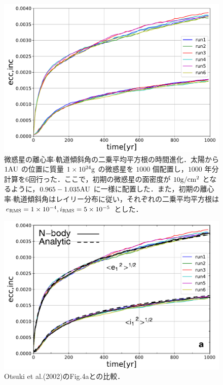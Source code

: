 \documentclass[11pt,a4paper,oneside,onecolumn]{jreport}
\begin{document}
\begin{figure}[H]
 \centering
 \includegraphics[width=12cm]{./image/Nbodytest_figa_6run.pdf}
 \caption{微惑星の離心率$\cdot$軌道傾斜角の二乗平均平方根の時間進化．太陽から $1 {\rm AU}$ の位置に質量 $1 \times 10^{24} {\rm g}$ の微惑星を $1000$ 個配置し，$1000$ 年分計算を6回行った．ここで，初期の微惑星の面密度が $10 {\rm g/cm^2}$ となるように，$0.965 - 1.035 {\rm AU}$ に一様に配置した．また，初期の離心率$\cdot$軌道傾斜角はレイリー分布に従い，それぞれの二乗平均平方根は $e_{\rm RMS} = 1 \times 10^{-4}, i_{\rm RMS} = 5 \times 10^{-5}$ とした．\label{}}
\end{figure}


\begin{figure}[H]
 \centering
 \includegraphics[width=12cm]{./image/Ohtsuki_figa_and_Nbodytest_6run.pdf}
 \caption{Otsuki et al.(2002)のFig.4aとの比較．\label{}}
\end{figure}
\end{document}
